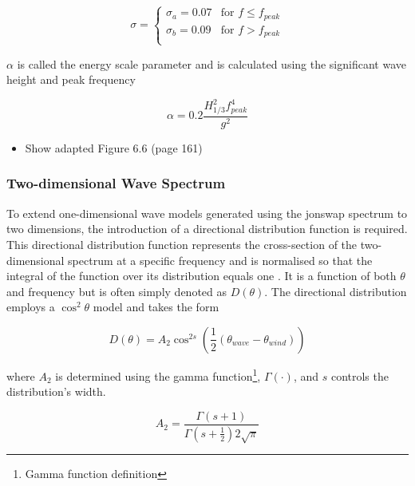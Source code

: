 \begin{equation*}
  \sigma =
    \begin{cases}
      \sigma_{a} = 0.07 & \text{for $f \leq f_{peak}$}\\
      \sigma_{b} = 0.09 & \text{for $f > f_{peak}$}\\
    \end{cases}       
\end{equation*}

$\alpha$ is called the energy scale parameter and is calculated using the significant wave height and peak frequency

\begin{equation} \label{eq:jonswap.alpha}
    \alpha = 0.2 \frac{H_{1/3}^2 f_{peak}^{4}}{g^{2}}
\end{equation}

\begin{itemize}
    \item Show adapted Figure 6.6 (page 161)
\end{itemize}

\subsubsection{Two-dimensional Wave Spectrum} \label{subsubsec:theory.waves.modelling.2D}

To extend one-dimensional wave models generated using the \acs{jonswap} spectrum to two dimensions, the introduction of a directional distribution function is required. This directional distribution function represents the cross-section of the two-dimensional spectrum at a specific frequency and is normalised so that the integral of the function over its distribution equals one \cite{Holthuijsen2007}. It is a function of both $\theta$ and frequency but is often simply denoted as $D(\theta)$. The directional distribution employs a $\cos^{2}\theta$ model \cite{Holthuijsen2007} and takes the form

\begin{equation} \label{eq:directionalDistributionFunc}
    D(\theta) = A_{2} \cos^{2s} \left ( \frac{1}{2} (\theta_{wave} - \theta_{wind}) \right )
\end{equation}

where $A_{2}$ is determined using the gamma function\footnote{Gamma function definition}, $\Gamma(\cdot)$, and $s$ controls the distribution's width. 

\begin{equation} \label{eq:directionalDistributionFunc.A2}
    A_{2} = \frac{\Gamma(s+1)}{\Gamma \left ( s + \frac{1}{2} \right )2\sqrt{\pi}}
\end{equation}

